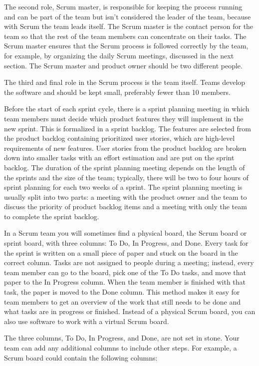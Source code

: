 The second role, Scrum master, is responsible for keeping the process running and can be part of the team but isn’t considered the leader of the team, because with Scrum the team leads itself. The Scrum master is the contact person for the team so that the rest of the team members can concentrate on their tasks. The Scrum master ensures that the Scrum process is followed correctly by the team, for example, by organizing the daily Scrum meetings, discussed in the next section. The Scrum master and product owner should be two different people.

The third and final role in the Scrum process is the team itself. Teams develop the software and should be kept small, preferably fewer than 10 members.


Before the start of each sprint cycle, there is a sprint planning meeting in which team members must decide which product features they will implement in the new sprint. This is formalized in a sprint backlog. The features are selected from the product backlog containing prioritized user stories, which are high-level requirements of new features. User stories from the product backlog are broken down into smaller tasks with an effort estimation and are put on the sprint backlog. The duration of the sprint planning meeting depends on the length of the sprints and the size of the team; typically, there will be two to four hours of sprint planning for each two weeks of a sprint. The sprint planning meeting is usually split into two parts: a meeting with the product owner and the team to discuss the priority of product backlog items and a meeting with only the team to complete the sprint backlog.

In a Scrum team you will sometimes find a physical board, the Scrum board or sprint board, with three columns: To Do, In Progress, and Done. Every task for the sprint is written on a small piece of paper and stuck on the board in the correct column. Tasks are not assigned to people during a meeting; instead, every team member can go to the board, pick one of the To Do tasks, and move that paper to the In Progress column. When the team member is finished with that task, the paper is moved to the Done column. This method makes it easy for team members to get an overview of the work that still needs to be done and what tasks are in progress or finished. Instead of a physical Scrum board, you can also use software to work with a virtual Scrum board.

The three columns, To Do, In Progress, and Done, are not set in stone. Your team can add any additional columns to include other steps. For example, a Scrum board could contain the following columns:

